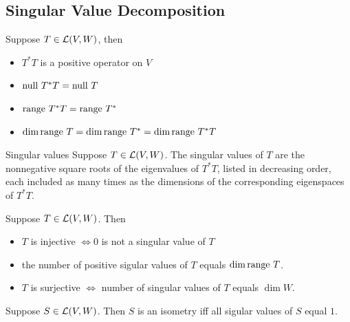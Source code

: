 \documentclass[12pt,a4paper]{article}
\begin{document}
    \subsection{Singular Value Decomposition}
    \begin{prop}
        Suppose $T\in\mathcal{L}(V,W)$, then
        \begin{itemize}
            \item $T^*T$ is a positive operator on $V$
            \item $\operatorname{null\,} T^*T=\operatorname{null\,} T$
            \item $\operatorname{range\,} T^*T=\operatorname{range\,} T^*$
            \item $\dim\operatorname{range\,} T=\dim \operatorname{range\,} T^*=\dim\operatorname{range\,} T^*T$
        \end{itemize}
    \end{prop}
    \hfill

    \begin{defi}{Singular values}
        Suppose $T\in\mathcal{L}(V,W)$. The singular values of $T$ are the nonnegative square roots of the eigenvalues of $T^*T$, listed in decreasing order, each included as many times as the dimensions of the corresponding eigenspaces of $T^*T$.
    \end{defi}
    \begin{prop}
        Suppose $T\in\mathcal{L}(V,W)$. Then
        \begin{itemize}
            \item $T$ is injective $\iff0$ is not a singular value of $T$
            \item the number of positive sigular values of $T$ equals $\dim\operatorname{range\,} T$.
            \item $T$ is surjective $\iff$ number of singular values of $T$ equals $\dim W$.
        \end{itemize}
    \end{prop}
    \hfill

    \begin{prop}
        Suppose $S\in\mathcal{L}(V,W)$. Then $S$ is an isometry iff all sigular values of $S$ equal $1$.
    \end{prop}
    \hfill
\end{document}
